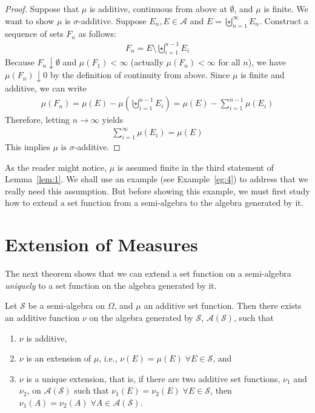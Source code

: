 \documentclass[thmcnt=section, 12pt, color=purple]{my-elegantbook}
\begin{document}
\begin{proof}
	Suppose that $\mu$ is additive,
	continuous from above at $\emptyset$,
	and $\mu$ is finite.
	We want to show $\mu$ is $\sigma$-additive.
	Suppose $E_n, E \in \mathcal{A}$ 
	and $E = \biguplus_{n=1}^\infty E_n$.
	Construct a sequence of sets $F_n$ as follows:
	\begin{align*}
		F_n = E \setminus \biguplus_{i=1}^{n-1} E_i
	\end{align*}
	Because $F_n \downarrow \emptyset$
	and $\mu(F_1) < \infty$ (actually $\mu(F_n) < \infty$ for all $n$),
	we have $\mu(F_n) \downarrow 0$
	by the definition of continuity from above.
	Since $\mu$ is finite and additive, we can write 
	\begin{align*}
		\mu(F_n) = \mu(E) - \mu(\biguplus_{i=1}^{n-1} E_i)
		= \mu(E) - \sum_{i=1}^{n-1} \mu (E_i)
	\end{align*}
	Therefore, letting $n \to \infty$ yields 
	\begin{align*}
		\sum_{i=1}^\infty \mu(E_i) = \mu(E)
	\end{align*}
	This implies $\mu$ is $\sigma$-additive.
\end{proof}

As the reader might notice, $\mu$ is assumed finite
in the third statement of Lemma~\ref{lem:1}.
We shall use an example (see Example~\ref{eg:4}) to address that
we really need this assumption.
But before showing this example, 
we must first study how to extend a set function 
from a semi-algebra to the algebra generated by it.


\section{Extension of Measures}


The next theorem shows that we can extend a set function 
on a semi-algebra \textit{uniquely} to 
a set function on the algebra generated by it.

\begin{theorem} \label{thm:3}
	Let $\mathcal{S}$ be a semi-algebra on $\Omega$,
	and $\mu$ an additive set function.
	Then there exists an additive function $\nu$
	on the algebra generated by $\mathcal{S}$, $\mathcal{A}(\mathcal{S})$,
	such that
	\begin{enumerate}
		\item $\nu$ is additive,
		\item $\nu$ is an extension of $\mu$, 
			i.e., $\nu(E) = \mu(E) \; \forall E \in \mathcal{S}$, and
		\item $\nu$ is a unique extension, that is, 
			if there are two additive 
			set functions, $\nu_1$ and $\nu_2$,
			on $\mathcal{A}(\mathcal{S})$
			such that $\nu_1(E) = \nu_2(E) \; \forall E \in \mathcal{S}$,
			then $\nu_1(A) = \nu_2(A) \; \forall A \in \mathcal{A}(\mathcal{S})$.
	\end{enumerate}
\end{theorem}
\end{document}
